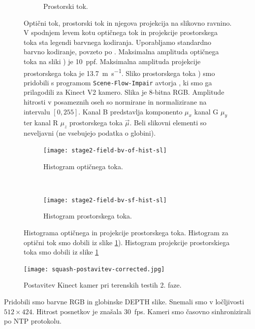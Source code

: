 \begin{figure}[!htb]
\begin{subfigure}[t]{0.3\columnwidth}
		\caption{Prostorski tok.}
	\end{subfigure}
	\caption[Optični tok, prostorski tok in njegova projekcija na slikovno ravnino]{Optični tok, prostorski tok in njegova projekcija na slikovno ravnino. V spodnjem levem kotu optičnega tok in projekcije prostorskega toka sta legendi barvnega kodiranja. Uporabljamo standardno barvno kodiranje, povzeto po \cite{baker2011database}. Maksimalna amplituda optičnega toka na sliki  ) je  \SI{10}{ppf}. Maksimalna amplituda projekcije prostorskega toka je \SI{13.7}{\m\per\s}. Sliko prostorskega toka ) smo pridobili s programom \texttt{Scene-Flow-Impair} avtorja \cite{jaimez2015primal}, ki smo ga prilagodili za Kinect V2 kamero. Slika je 8-bitna RGB. Amplitude hitrosti v posameznih oseh so normirane in normalizirane na intervalu $[0,255]$. Kanal B predstavlja komponento $\mu_x$ kanal G $\mu_y$ ter kanal R $\mu_z$ prostorskega toka $\vec{\mu}$. Beli slikovni elementi so neveljavni (ne vsebujejo podatka o globini).}
	\label{fig:stage2-field-sfof}
\end{figure}



\begin{figure}[!htb]
	\centering
	\begin{subfigure}[t]{0.45\columnwidth}
		\texttt{[image: stage2-field-bv-of-hist-sl]}
		\caption{Histogram optičnega toka.}
	\end{subfigure}
	~
	\begin{subfigure}[t]{0.45\columnwidth}
		\texttt{[image: stage2-field-bv-sf-hist-sl]}
		\caption{Histogram prostorskega toka.}
	\end{subfigure}
	\caption[Histograma optičnega in projekcije prostorskega toka]{Histograma optičnega in projekcije prostorskega toka. Histogram za optični tok smo dobili iz slike \ref{fig:stage2-field-sfof}). Histogram projekcije prostorskiega toka smo dobili iz slike \ref{fig:stage2-field-sfof}}
	\label{fig:stage2-field-hist}
\end{figure}



\begin{figure}[!htb]
	\centering
		\texttt{[image: squash-postavitev-corrected.jpg]}	
	\caption{Postavitev Kinect kamer pri terenskih testih 2. faze.}
	\label{fig:field-postavitev-kamer}
\end{figure}


Pridobili smo barvne RGB in globinske DEPTH slike. Snemali smo v ločljivosti $512 \times 424$. Hitrost posnetkov je znašala \SI{30}{fps}. Kameri smo časovno sinhronizirali po NTP protokolu.


